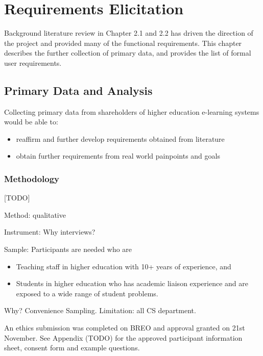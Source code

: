 \chapter{Requirements Elicitation}
\graphicspath{{Chapter4/Figs/Raster/}{Chapter4/Figs/}}

Background literature review in Chapter 2.1 and 2.2 has driven the direction of the project and
provided many of the functional requirements. This chapter describes the further collection of primary
data, and provides the list of formal user requirements.

\section{Primary Data and Analysis}
Collecting primary data from shareholders of higher education e-learning systems would be able to:
\begin{itemize}
	\item reaffirm and further develop requirements obtained from literature
	\item obtain further requirements from real world painpoints and goals
\end{itemize}

\subsection{Methodology}

[TODO]

Method: qualitative

Instrument: Why interviews?

Sample: Participants are needed who are
\begin{itemize}
	\item Teaching staff in higher education with 10+ years of experience, and
	\item Students in higher education who has academic liaison experience and are exposed to a wide range of student problems.
\end{itemize}

Why? Convenience Sampling. Limitation: all CS department.

An ethics submission was completed on BREO and approval granted on 21st November.
See Appendix (TODO) for the approved participant information sheet, consent form and example questions.

